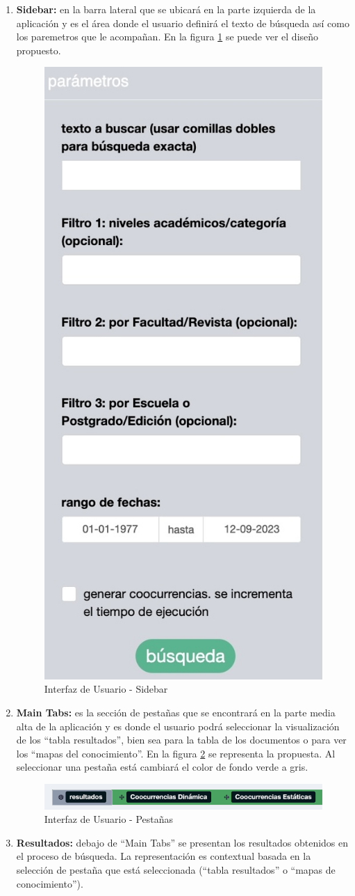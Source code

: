 \documentclass[
  12pt,
  openany]{book}
\begin{document}
\begin{enumerate}
\def\labelenumi{\arabic{enumi}.}
\item
  \textbf{Sidebar:} en la barra lateral que se ubicará en la parte izquierda de la aplicación y es el área donde el usuario definirá el texto de búsqueda así como los paremetros que le acompañan. En la figura \ref{fig:sidebar2} se puede ver el diseño propuesto.

  \begin{figure}

  {\centering \includegraphics[width=0.2\linewidth]{images/05-desarrollo/4_ciclo/UI/sidebar} 

  }

  \caption{Interfaz de Usuario - Sidebar}\label{fig:sidebar2}
  \end{figure}
\item
  \textbf{Main Tabs:} es la sección de pestañas que se encontrará en la parte media alta de la aplicación y es donde el usuario podrá seleccionar la visualización de los ``tabla resultados'', bien sea para la tabla de los documentos o para ver los ``mapas del conocimiento''. En la figura \ref{fig:maintab} se representa la propuesta. Al seleccionar una pestaña está cambiará el color de fondo verde a gris.

  \begin{figure}

  {\centering \includegraphics[width=0.9\linewidth]{images/05-desarrollo/4_ciclo/UI/maintab} 

  }

  \caption{Interfaz de Usuario - Pestañas }\label{fig:maintab}
  \end{figure}
\item
  \textbf{Resultados:} debajo de ``Main Tabs'' se presentan los resultados obtenidos en el proceso de búsqueda. La representación es contextual basada en la selección de pestaña que está seleccionada (``tabla resultados'' o ``mapas de conocimiento'').


\end{enumerate}
\end{document}
